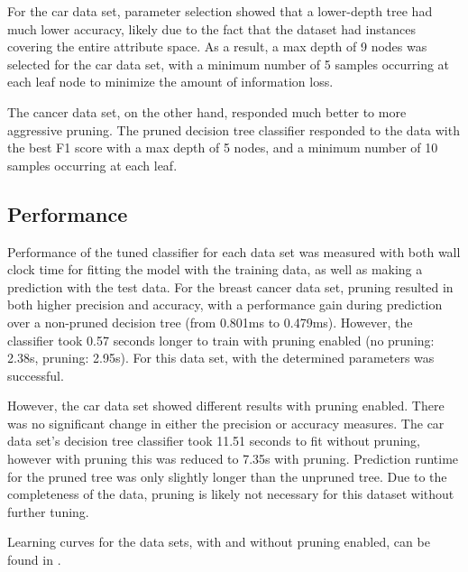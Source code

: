 \documentclass{article}
\begin{document}
    For the car data set, parameter selection showed that a lower-depth tree had much lower accuracy, likely due to the fact that the dataset had instances covering the entire attribute space. As a result, a max depth of 9 nodes was selected for the car data set, with a minimum number of 5 samples occurring at each leaf node to minimize the amount of information loss.

    The cancer data set, on the other hand, responded much better to more aggressive pruning. The pruned decision tree classifier responded to the data with the best F1 score with a max depth of 5 nodes, and a minimum number of 10 samples occurring at each leaf.

    \subsection{Performance}
    Performance of the tuned classifier for each data set was measured with both wall clock time for fitting the model with the training data, as well as making a prediction with the test data. For the breast cancer data set, pruning resulted in both higher precision and accuracy, with a performance gain during prediction over a non-pruned decision tree (from 0.801ms to 0.479ms). However, the classifier took 0.57 seconds longer to train with pruning enabled (no pruning: 2.38s, pruning: 2.95s). For this data set, with the determined parameters was successful.

    However, the car data set showed different results with pruning enabled. There was no significant change in either the precision or accuracy measures. The car data set's decision tree classifier took 11.51 seconds to fit without pruning, however with pruning this was reduced to 7.35s with pruning. Prediction runtime for the pruned tree was only slightly longer than the unpruned tree. Due to the completeness of the data, pruning is likely not necessary for this dataset without further tuning.

    Learning curves for the data sets, with and without pruning enabled, can be found in .
\end{document}
